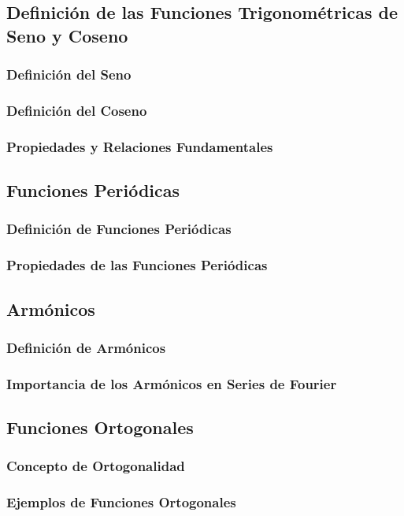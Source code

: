 \subsection{Definición de las Funciones Trigonométricas de Seno y Coseno}
\subsubsection{Definición del Seno}
\subsubsection{Definición del Coseno}
\subsubsection{Propiedades y Relaciones Fundamentales}

\subsection{Funciones Periódicas}
\subsubsection{Definición de Funciones Periódicas}
\subsubsection{Propiedades de las Funciones Periódicas}

\subsection{Armónicos}
\subsubsection{Definición de Armónicos}
\subsubsection{Importancia de los Armónicos en Series de Fourier}

\subsection{Funciones Ortogonales}
\subsubsection{Concepto de Ortogonalidad}
\subsubsection{Ejemplos de Funciones Ortogonales}

